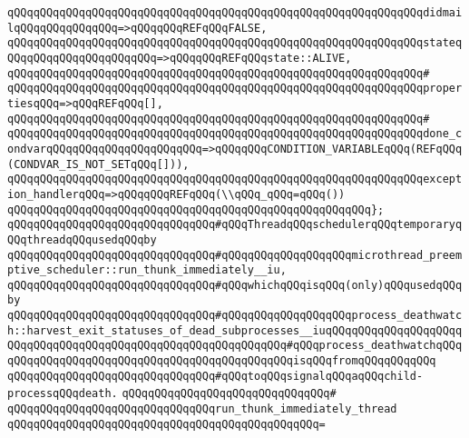 \verb|qQQqqQQqqQQqqQQqqQQqqQQqqQQqqQQqqQQqqQQqqQQqqQQqqQQqqQQqqQQqqQQqdidmailqQQqqQQqqQQqqQQq=>qQQqqQQqREFqQQqFALSE,|\newline
\verb|qQQqqQQqqQQqqQQqqQQqqQQqqQQqqQQqqQQqqQQqqQQqqQQqqQQqqQQqqQQqqQQqstateqQQqqQQqqQQqqQQqqQQqqQQq=>qQQqqQQqREFqQQqstate::ALIVE,|\newline
\verb|qQQqqQQqqQQqqQQqqQQqqQQqqQQqqQQqqQQqqQQqqQQqqQQqqQQqqQQqqQQqqQQq#|\newline
\verb|qQQqqQQqqQQqqQQqqQQqqQQqqQQqqQQqqQQqqQQqqQQqqQQqqQQqqQQqqQQqqQQqpropertiesqQQq=>qQQqREFqQQq[],|\newline
\verb|qQQqqQQqqQQqqQQqqQQqqQQqqQQqqQQqqQQqqQQqqQQqqQQqqQQqqQQqqQQqqQQq#|\newline
\verb|qQQqqQQqqQQqqQQqqQQqqQQqqQQqqQQqqQQqqQQqqQQqqQQqqQQqqQQqqQQqqQQqdone_condvarqQQqqQQqqQQqqQQqqQQqqQQq=>qQQqqQQqCONDITION_VARIABLEqQQq(REFqQQq(CONDVAR_IS_NOT_SETqQQq[])),|\newline
\verb|qQQqqQQqqQQqqQQqqQQqqQQqqQQqqQQqqQQqqQQqqQQqqQQqqQQqqQQqqQQqqQQqexception_handlerqQQq=>qQQqqQQqREFqQQq(\\qQQq_qQQq=qQQq())|\newline
\verb|qQQqqQQqqQQqqQQqqQQqqQQqqQQqqQQqqQQqqQQqqQQqqQQqqQQqqQQq};|\newline
\newline
\verb|qQQqqQQqqQQqqQQqqQQqqQQqqQQqqQQq#qQQqThreadqQQqschedulerqQQqtemporaryqQQqthreadqQQqusedqQQqby|\newline
\verb|qQQqqQQqqQQqqQQqqQQqqQQqqQQqqQQq#qQQqqQQqqQQqqQQqqQQqmicrothread_preemptive_scheduler::run_thunk_immediately__iu,|\newline
\verb|qQQqqQQqqQQqqQQqqQQqqQQqqQQqqQQq#qQQqwhichqQQqisqQQq(only)qQQqusedqQQqby|\newline
\verb|qQQqqQQqqQQqqQQqqQQqqQQqqQQqqQQq#qQQqqQQqqQQqqQQqqQQqprocess_deathwatch::harvest_exit_statuses_of_dead_subprocesses__iuqQQqqQQqqQQqqQQqqQQqqQQqqQQqqQQqqQQqqQQqqQQqqQQqqQQqqQQqqQQqqQQq#qQQqprocess_deathwatchqQQqqQQqqQQqqQQqqQQqqQQqqQQqqQQqqQQqqQQqqQQqqQQqisqQQqfromqQQqqQQqqQQq|\newline
\verb|qQQqqQQqqQQqqQQqqQQqqQQqqQQqqQQq#qQQqtoqQQqsignalqQQqaqQQqchild-processqQQqdeath.|\newline
\verb|qQQqqQQqqQQqqQQqqQQqqQQqqQQqqQQq#|\newline
\verb|qQQqqQQqqQQqqQQqqQQqqQQqqQQqqQQqrun_thunk_immediately_thread|\newline
\verb|qQQqqQQqqQQqqQQqqQQqqQQqqQQqqQQqqQQqqQQqqQQqqQQq=|\newline
